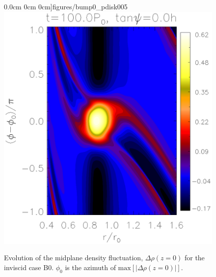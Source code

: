\begin{figure}
    0.0cm 0cm
    0cm]{figures/bump0_pdisk005}\includegraphics[scale=.27,clip=true,clip=true,trim=2.3cm
    0.0cm 0cm
    0cm]{figures/bump0_pdisk010}
  \caption{Evolution of the midplane density fluctuation, 
    $\Delta\rho(z=0)$ for the inviscid case B0. 
    $\phi_0$ is the azimuth of $\mathrm{max}\left[|\Delta\rho(z=0)|\right]$.   
    \label{bump0_bump1}}
\end{figure}

